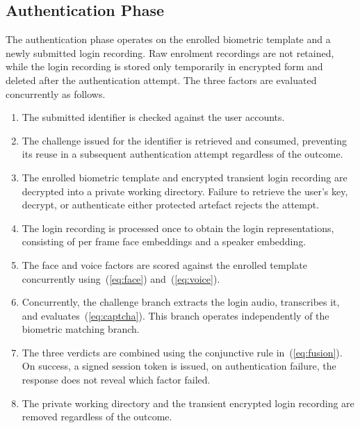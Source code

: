 \documentclass[runningheads]{llncs}
\begin{document}
\subsection{Authentication Phase}
{\color{black}
\noindent The authentication phase operates on the enrolled biometric template and a newly submitted login recording. Raw enrolment recordings are not retained, while the login recording is stored only temporarily in encrypted form and deleted after the authentication attempt. The three factors are evaluated concurrently as follows.
\begin{enumerate}
\item The submitted identifier is checked against the user accounts.
\item The challenge issued for the identifier is retrieved and consumed, preventing its reuse in a subsequent authentication attempt regardless of the outcome.
\item The enrolled biometric template and encrypted transient login recording are decrypted into a private working directory. Failure to retrieve the user's key, decrypt, or authenticate either protected artefact rejects the attempt.
\item The login recording is processed once to obtain the login representations, consisting of per frame face embeddings and a speaker embedding.
\item The face and voice factors are scored against the enrolled template concurrently using~(\ref{eq:face}) and~(\ref{eq:voice}).
\item Concurrently, the challenge branch extracts the login audio, transcribes it, and evaluates~(\ref{eq:captcha}). This branch operates independently of the biometric matching branch.
\item The three verdicts are combined using the conjunctive rule in~(\ref{eq:fusion}). On success, a signed session token is issued, on authentication failure, the response does not reveal which factor failed.
\item The private working directory and the transient encrypted login recording are removed regardless of the outcome.
\end{enumerate}
}
\end{document}
